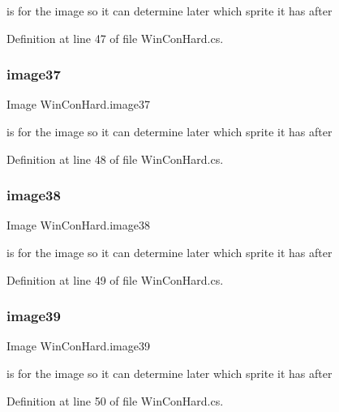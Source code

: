 is for the image so it can determine later which sprite it has after 

Definition at line 47 of file Win\+Con\+Hard.\+cs.

\mbox{\label{class_win_con_hard_a4a771c988e3ad23e086d62dc377ab42d}} 
\subsubsection{\texorpdfstring{image37}{image37}}
{\footnotesize\ttfamily Image Win\+Con\+Hard.\+image37}

is for the image so it can determine later which sprite it has after 

Definition at line 48 of file Win\+Con\+Hard.\+cs.

\mbox{\label{class_win_con_hard_a642f862d9566e73b4294cd2704be5c0a}} 
\subsubsection{\texorpdfstring{image38}{image38}}
{\footnotesize\ttfamily Image Win\+Con\+Hard.\+image38}

is for the image so it can determine later which sprite it has after 

Definition at line 49 of file Win\+Con\+Hard.\+cs.

\mbox{\label{class_win_con_hard_aa40f140f05a6cf720b2cf0cb4fa1a6a5}} 
\subsubsection{\texorpdfstring{image39}{image39}}
{\footnotesize\ttfamily Image Win\+Con\+Hard.\+image39}

is for the image so it can determine later which sprite it has after 

Definition at line 50 of file Win\+Con\+Hard.\+cs.

\mbox{\label{class_win_con_hard_a14a2ff3b5b2492f5074359ab380c9fdf}} 
